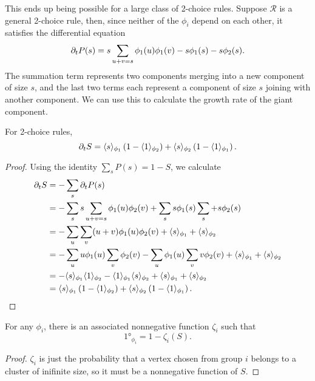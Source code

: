 \documentclass[twoside,10pt]{article}
\begin{document}
This ends up being possible for a large class of 2-choice rules. Suppose $\mathcal{R}$ is a general 2-choice rule, then, since neither of the $\phi_i$ depend on each other, it satisfies the differential equation
	\[
		\partial_{t}{P(s)} = s \sum_{u+v=s} \phi_1(u) \phi_1(v) - s \phi_1(s) - s\phi_2(s).
	\] 
	The summation term represents two components merging into a new component of size $s$, and the last two terms each represent a component of size $s$ joining with another component. We can use this to calculate the growth rate of the giant component.
\begin{prop}
        \label{2c-sdelS}
        For 2-choice rules,
        \[
                \partial_{t}{S} = \langle s \rangle_{\phi_1}\left( 1-\langle 1 \rangle_{\phi_2} \right) + \langle s \rangle_{\phi_2}\left( 1-\langle 1 \rangle_{\phi_1} \right).
        \]
\end{prop}
\begin{proof}
        Using the identity $\sum_s P(s) = 1-S$, we calculate
        \begin{align*}
                \partial_{t}{S} &= - \sum_s \partial_{t}{P(s)} \\
                          &= - \sum_s s \sum_{u+v=s}\phi_1(u)\phi_2(v) + \sum_s s \phi_1(s) \sum_s + s \phi_2(s) \\
                          &= - \sum_u \sum_v (u+v) \phi_1(u)\phi_2(v) + \langle s \rangle_{\phi_1} + \langle s \rangle_{\phi_2} \\
                          &= -\sum_{u}u \phi_1(u) \sum_{v} \phi_2(v) - \sum_{u}\phi_1(u)\sum_{v}v \phi_2(v) + \langle s \rangle_{\phi_1} + \langle s \rangle_{\phi_2} \\
                          &= -\langle s \rangle_{\phi_1}\langle 1 \rangle_{\phi_2} - \langle 1 \rangle_{\phi_1}\langle s \rangle_{\phi_2} + \langle s \rangle_{\phi_1}+\langle s \rangle_{\phi_2} \\
                          &= \langle s \rangle_{\phi_1}\left( 1-\langle 1 \rangle_{\phi_2} \right) + \langle s \rangle_{\phi_2}\left( 1-\langle 1 \rangle_{\phi_1} \right).
        \end{align*}
\end{proof}

\begin{lem}[]
For any $\phi_i$, there is an associated nonnegative function $\zeta_i$ such that
\[
	\ang{1}_{\phi_i} = 1 - \zeta_i(S).
\] 
\end{lem}
\begin{proof}
	$\zeta_i$ is just the probability that a vertex chosen from group $i$ belongs to a cluster of inifinite size, so it must be a nonnegative function of $S$. 
\end{proof}
\end{document}
